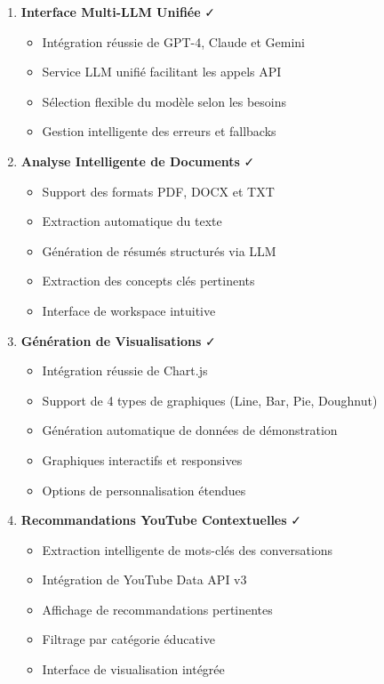 \begin{enumerate}
    \item \textbf{Interface Multi-LLM Unifiée} ✓
    \begin{itemize}
        \item Intégration réussie de GPT-4, Claude et Gemini
        \item Service LLM unifié facilitant les appels API
        \item Sélection flexible du modèle selon les besoins
        \item Gestion intelligente des erreurs et fallbacks
    \end{itemize}
    
    \item \textbf{Analyse Intelligente de Documents} ✓
    \begin{itemize}
        \item Support des formats PDF, DOCX et TXT
        \item Extraction automatique du texte
        \item Génération de résumés structurés via LLM
        \item Extraction des concepts clés pertinents
        \item Interface de workspace intuitive
    \end{itemize}
    
    \item \textbf{Génération de Visualisations} ✓
    \begin{itemize}
        \item Intégration réussie de Chart.js
        \item Support de 4 types de graphiques (Line, Bar, Pie, Doughnut)
        \item Génération automatique de données de démonstration
        \item Graphiques interactifs et responsives
        \item Options de personnalisation étendues
    \end{itemize}
    
    \item \textbf{Recommandations YouTube Contextuelles} ✓
    \begin{itemize}
        \item Extraction intelligente de mots-clés des conversations
        \item Intégration de YouTube Data API v3
        \item Affichage de recommandations pertinentes
        \item Filtrage par catégorie éducative
        \item Interface de visualisation intégrée
    \end{itemize}
    

\end{enumerate}
